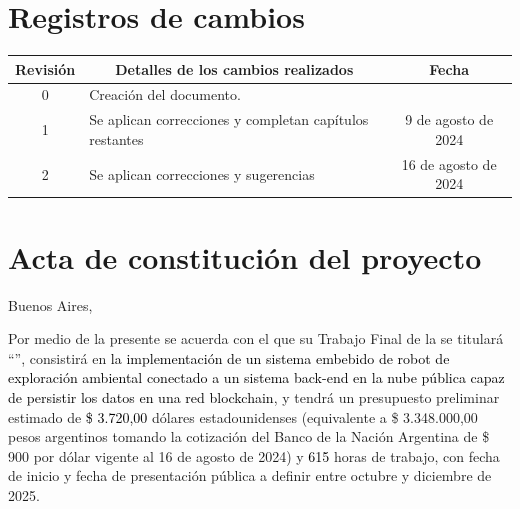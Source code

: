 \documentclass[
11pt, %
]{charter}
\begin{document}
\maketitle
\thispagestyle{empty}
\pagebreak


\thispagestyle{empty}
{\setlength{\parskip}{0pt}
\tableofcontents{}
}
\pagebreak


\section*{Registros de cambios}
\label{sec:registro}


\begin{table}[ht]
\label{tab:registro}
\centering
\begin{tabularx}{\linewidth}{@{}|c|X|c|@{}}
\hline
\rowcolor[HTML]{C0C0C0}
Revisión & \multicolumn{1}{c|}{\cellcolor[HTML]{C0C0C0}Detalles de los cambios realizados} & Fecha      \\ \hline
0      & Creación del documento.                                 								&\fechaInicioName \\ \hline
1      & Se aplican correcciones y completan capítulos restantes								& 9 de agosto de 2024 \\ \hline
2      & Se aplican correcciones y sugerencias								& 16 de agosto de 2024 \\ \hline
\end{tabularx}
\end{table}

\pagebreak



\section*{Acta de constitución del proyecto}
\label{sec:acta}

\begin{flushright}
Buenos Aires, \fechaInicioName
\end{flushright}

\vspace{2cm}

Por medio de la presente se acuerda con el \authorname\hspace{1px} que su Trabajo Final de la \degreename\hspace{1px} se titulará ``\ttitle'', consistirá en \textcolor{black}{la implementación de un sistema embebido de robot de exploración ambiental conectado a un sistema back-end en la nube pública capaz de persistir los datos en una red blockchain}, y tendrá un presupuesto preliminar estimado de \textcolor{black}{\$ 3.720,00} dólares estadounidenses (equivalente a \$ 3.348.000,00 pesos argentinos tomando la cotización del Banco de la Nación Argentina de \$ 900 por dólar vigente al 16 de agosto de 2024) y \textcolor{black}{615} horas de trabajo, con fecha de inicio \fechaInicioName\hspace{1px} y fecha de presentación pública a definir entre octubre y diciembre de 2025.
\end{document}
